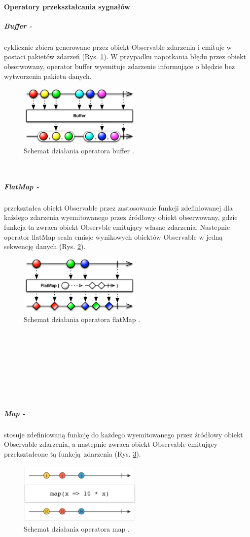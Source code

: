\documentclass[12pt,oneside,a4paper]{report}
\begin{document}
\paragraph{Operatory przekształcania sygnałów}
\subparagraph{Buffer -}cyklicznie zbiera generowane przez obiekt Observable zdarzenia i emituje w postaci pakietów zdarzeń (Rys. \ref{buffer}). W przypadku napotkania błędu przez obiekt obserwowany, operator buffer wyemituje zdarzenie informujące o błędzie bez wytworzenia pakietu danych.
\begin{figure}[ht!]
	\centering
	\includegraphics[width=6cm]{buffer}
	\caption{Schemat działania operatora buffer \cite{operators}.}
	\label{buffer}
\end{figure}\\
\subparagraph{FlatMap -}przekształca obiekt Observable przez zastosowanie funkcji zdefiniowanej dla każdego zdarzenia wyemitowanego  przez źródłowy obiekt obserwowany, gdzie funkcja ta zwraca obiekt Observble emitujący własne zdarzenia. Nastepnie operator flatMap scala emisje wynikowych obiektów Observable w jedną sekwencję danych (Rys. \ref{flatmap}).
\begin{figure}[ht!]
	\centering
	\includegraphics[width=6cm]{flatmap}
	\caption{Schemat działania operatora flatMap \cite{operators}.}
	\label{flatmap}
\end{figure}\\\\\\\\\\\\\\

\subparagraph{Map -}stosuje zdefiniowaną funkcję do każdego wyemitowanego przez źródłowy obiekt Observable zdarzenia, a następnie zwraca obiekt Observable emitujący przekształcone tą funkcją zdarzenia (Rys. \ref{map}).
\begin{figure}[ht!]
	\centering
	\includegraphics[width=6cm]{map}
	\caption{Schemat działania operatora map \cite{marbles}.}
	\label{map}
\end{figure}\\
\end{document}
